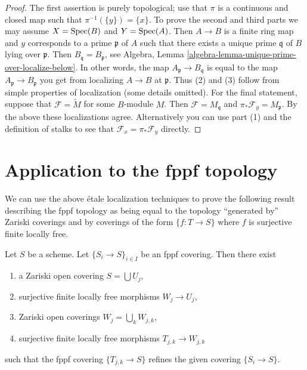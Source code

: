 \begin{proof}
The first assertion is purely topological; use that
$\pi$ is a continuous and closed map such that $\pi^{-1}(\{y\}) = \{x\}$.
To prove the second and third parts we may assume
$X = \mathop{\rm Spec}(B)$ and $Y = \mathop{\rm Spec}(A)$. Then
$A \to B$ is a finite ring map and $y$ corresponds to a prime
$\mathfrak p$ of $A$ such that there exists a unique prime $\mathfrak q$ of
$B$ lying over $\mathfrak p$. Then
$B_{\mathfrak q} = B_{\mathfrak p}$, see
Algebra, Lemma \ref{algebra-lemma-unique-prime-over-localize-below}.
In other words, the map $A_{\mathfrak p} \to B_{\mathfrak q}$
is equal to the map $A_{\mathfrak p} \to B_{\mathfrak p}$ you get
from localizing $A \to B$ at $\mathfrak p$.
Thus (2) and (3) follow from simple properties of localization
(some details omitted). For the final statement, suppose that
$\mathcal{F} = \widetilde M$ for some $B$-module $M$.
Then $\mathcal{F} = M_{\mathfrak q}$ and
$\pi_*\mathcal{F}_y = M_{\mathfrak p}$. By the above these
localizations agree. Alternatively you can use part (1) and
the definition of stalks to see that $\mathcal{F}_x = \pi_*\mathcal{F}_y$
directly.
\end{proof}






\section{Application to the fppf topology}
\label{section-application-fppf}

\noindent
We can use the above \'etale localization techniques to prove the
following result describing the fppf topology as being equal to
the topology ``generated by'' Zariski coverings and by coverings of the
form $\{f : T \to S\}$ where $f$ is surjective finite locally free.

\begin{lemma}
\label{lemma-dominate-fppf}
Let $S$ be a scheme. Let $\{S_i \to S\}_{i \in I}$ be an fppf covering.
Then there exist
\begin{enumerate}
\item a Zariski open covering $S = \bigcup U_j$,
\item surjective finite locally free morphisms $W_j \to U_j$,
\item Zariski open coverings $W_j = \bigcup_k W_{j, k}$,
\item surjective finite locally free morphisms $T_{j, k} \to W_{j, k}$
\end{enumerate}
such that the fppf covering $\{T_{j, k} \to S\}$ refines the given
covering $\{S_i \to S\}$.
\end{lemma}

